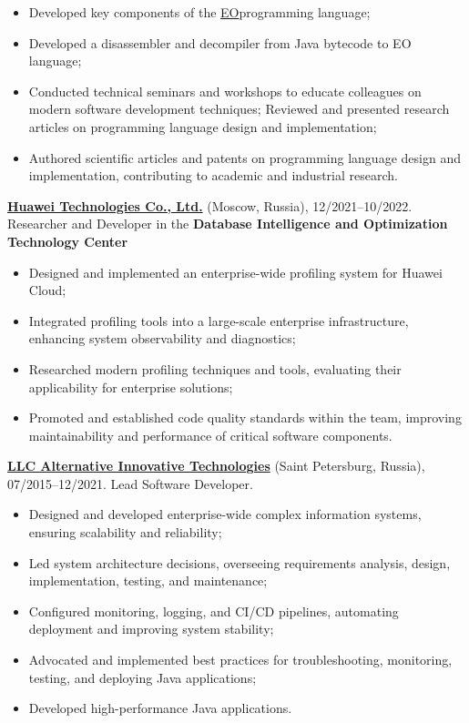 \documentclass{vl}
\begin{document}
    \begin{itemize}
        \itemsep0em
        \item Developed key components of the \href{https://github.com/objectionary/eo}{EO}programming language;
        \item Developed a disassembler and decompiler from Java bytecode to EO language;
        \item Conducted technical seminars and workshops to educate colleagues on modern software development techniques;
        Reviewed and presented research articles on programming language design and implementation;
        \item Authored scientific articles and patents on programming language design and implementation,
        contributing to academic and industrial research.
    \end{itemize}

    \textbf{\href{https://www.huawei.com}{Huawei Technologies Co., Ltd.}} (Moscow, Russia), 12/2021--10/2022.
    Researcher and Developer in the \textbf{Database Intelligence and Optimization Technology Center}

    \begin{itemize}
        \itemsep0em
        \item Designed and implemented an enterprise-wide profiling system for Huawei Cloud;
        \item Integrated profiling tools into a large-scale enterprise infrastructure, enhancing system
        observability and diagnostics;
        \item Researched modern profiling techniques and tools, evaluating their applicability for enterprise solutions;
        \item Promoted and established code quality standards within the team, improving maintainability and performance
        of critical software components.
    \end{itemize}

    \textbf{\href{https://altinntech.com/en/}{LLC Alternative Innovative Technologies}} (Saint Petersburg, Russia),
    07/2015--12/2021.
    Lead Software Developer.

    \begin{itemize}
        \itemsep0em
        \item Designed and developed enterprise-wide complex information systems, ensuring scalability and reliability;
        \item Led system architecture decisions, overseeing requirements analysis, design, implementation, testing,
        and maintenance;
        \item Configured monitoring, logging, and CI/CD pipelines, automating deployment and improving system stability;
        \item Advocated and implemented best practices for troubleshooting, monitoring, testing, and deploying
        Java applications;
        \item Developed high-performance Java applications.
    \end{itemize}
\end{document}

